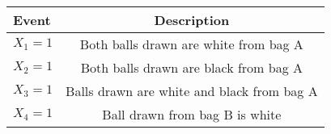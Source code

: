 \begin{tabular}{|l|c|}

\hline
\textbf{Event} & \textbf{Description} \\
\hline
$X_1 = 1$ &  Both balls drawn are white from bag A \\
\hline
$X_2 = 1$ &  Both balls drawn are black from bag A \\
\hline
$X_3 = 1$ &  Balls drawn are white and black from bag A \\
\hline
$X_4 = 1$ &  Ball drawn from bag B is white \\
\hline
\end{tabular}